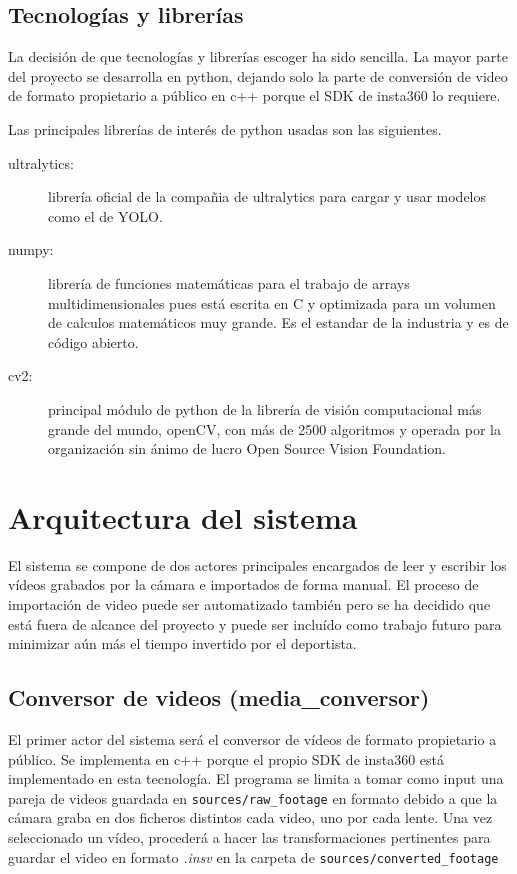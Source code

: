 \subsection{Tecnologías y librerías}

La decisión de que tecnologías y librerías escoger ha sido sencilla. La mayor parte del proyecto se desarrolla en python, dejando solo la parte de conversión de video de formato propietario a público en c++ porque el SDK de insta360 lo requiere.

Las principales librerías de interés de python usadas son las siguientes.
\begin{description}
	\item[ultralytics:] librería oficial de la compañia de ultralytics para cargar y usar modelos como el de YOLO.
	\item[numpy:] librería de funciones matemáticas para el trabajo de arrays multidimensionales pues está escrita en C y optimizada para un volumen de calculos matemáticos muy grande. Es el estandar de la industria y es de código abierto.
	\item[cv2:] principal módulo de python de la librería de visión computacional más grande del mundo, openCV, con más de 2500 algoritmos y operada por la organización sin ánimo de lucro Open Source Vision Foundation.
\end{description}


\section[Arquitectura]{Arquitectura del sistema}
El sistema se compone de dos actores principales encargados de leer y escribir los vídeos grabados por la cámara e importados de forma manual. El proceso de importación de video puede ser automatizado también pero se ha decidido que está fuera de alcance del proyecto y puede ser incluído como trabajo futuro para minimizar aún más el tiempo invertido por el deportista.
\vspace{20px}

\subsection{Conversor de videos (media\_conversor)}
El primer actor del sistema será el conversor de vídeos de formato propietario a público. Se implementa en c++ porque el propio SDK de insta360 está implementado en esta tecnología. El programa se limita a tomar como input una pareja de videos guardada en \verb|sources/raw_footage| en formato  debido a que la cámara graba en dos ficheros distintos cada video, uno por cada lente. Una vez seleccionado un vídeo, procederá a hacer las transformaciones pertinentes para guardar el video en formato \textit{.insv} en la carpeta de \verb|sources/converted_footage|  

